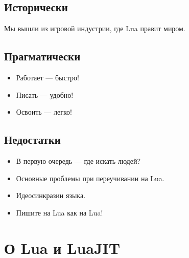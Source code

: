 \documentclass[aspectratio=169,handout]{beamer}
\begin{document}

\subsection*{Исторически}

\begin{frame}
  Мы вышли из игровой индустрии, где Lua правит миром.
\end{frame}


\subsection*{Прагматически}

\begin{frame}
  \begin{itemize}
    \item Работает — быстро!
    \item Писать — удобно!
    \item Освоить — легко!
  \end{itemize}
\end{frame}


\subsection*{Недостатки}

\begin{frame}
  \begin{itemize}
    \item В первую очередь — где искать людей?
    \item Основные проблемы при переучивании на Lua.
    \item Идеосинкразии языка.
    \item Пишите на Lua как на Lua!
  \end{itemize}
\end{frame}


\section{О Lua и LuaJIT}
\end{document}
